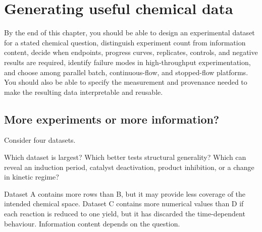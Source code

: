 
\chapter{Generating useful chemical data}

\begin{notebox}
  By the end of this chapter, you should be able to design an experimental dataset for a stated chemical question, distinguish experiment count from information content, decide when endpoints, progress curves, replicates, controls, and negative results are required, identify failure modes in high-throughput experimentation, and choose among parallel batch, continuous-flow, and stopped-flow platforms.
  You should also be able to specify the measurement and provenance needed to make the resulting data interpretable and reusable.
\end{notebox}

\section{More experiments or more information?}

Consider four datasets.


Which dataset is largest?
Which better tests structural generality?
Which can reveal an induction period, catalyst deactivation, product inhibition, or a change in kinetic regime?

Dataset A contains more rows than B, but it may provide less coverage of the intended chemical space.
Dataset C contains more numerical values than D if each reaction is reduced to one yield, but it has discarded the time-dependent behaviour.
Information content depends on the question.

